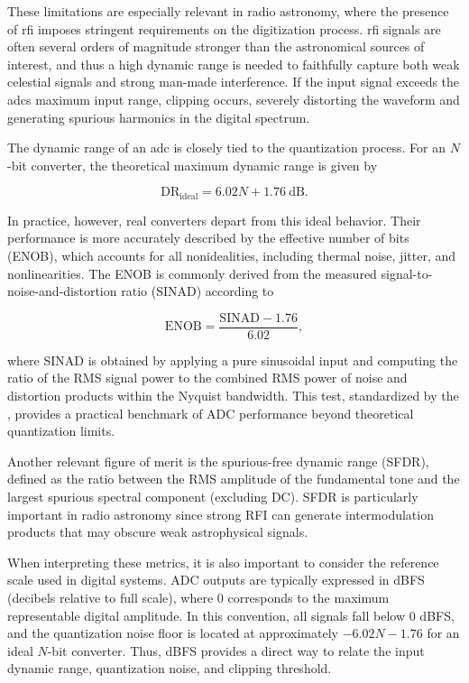 These limitations are especially relevant in radio astronomy, where the presence of \gls{rfi} imposes stringent requirements on the digitization process. \gls{rfi} signals are often several orders of magnitude stronger than the astronomical sources of interest, and thus a high dynamic range is needed to faithfully capture both weak celestial signals and strong man-made interference. If the input signal exceeds the \glspl{adc} maximum input range, clipping occurs, severely distorting the waveform and generating spurious harmonics in the digital spectrum.

The dynamic range of an \gls{adc} is closely tied to the quantization process. For an $N$-bit converter, the theoretical maximum dynamic range is given by

\begin{equation}
\text{DR}_{\text{ideal}} = 6.02N + 1.76 \ \text{dB}.
\label{eq:ideal_dynamic_range}
\end{equation}

In practice, however, real converters depart from this ideal behavior. Their performance is more accurately described by the effective number of bits (ENOB), which accounts for all nonidealities, including thermal noise, jitter, and nonlinearities. The ENOB is commonly derived from the measured signal-to-noise-and-distortion ratio (SINAD) according to

\begin{equation}
\text{ENOB} = \frac{\text{SINAD} - 1.76}{6.02},
\label{eq:enob}
\end{equation}

where SINAD is obtained by applying a pure sinusoidal input and computing the ratio of the RMS signal power to the combined RMS power of noise and distortion products within the Nyquist bandwidth. This test, standardized by the \citet{ADCstandards}, provides a practical benchmark of ADC performance beyond theoretical quantization limits.

Another relevant figure of merit is the spurious-free dynamic range (SFDR), defined as the ratio between the RMS amplitude of the fundamental tone and the largest spurious spectral component (excluding DC). SFDR is particularly important in radio astronomy since strong RFI can generate intermodulation products that may obscure weak astrophysical signals.

When interpreting these metrics, it is also important to consider the reference scale used in digital systems. ADC outputs are typically expressed in dBFS (decibels relative to full scale), where 
0  corresponds to the maximum representable digital amplitude. In this convention, all signals fall below 0 dBFS, and the quantization noise floor is located at approximately 
$-6.02N-1.76$  for an ideal $N$-bit converter. Thus, dBFS provides a direct way to relate the input dynamic range, quantization noise, and clipping threshold.


